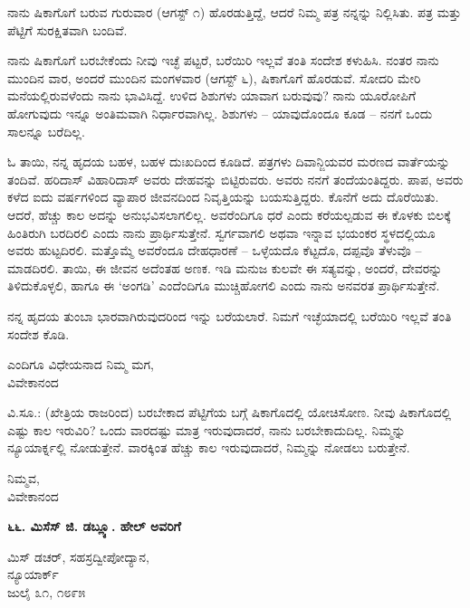 ನಾನು ಷಿಕಾಗೊಗೆ ಬರುವ ಗುರುವಾರ (ಆಗಸ್ಟ್ ೧) ಹೊರಡುತ್ತಿದ್ದೆ, ಆದರೆ ನಿಮ್ಮ ಪತ್ರ ನನ್ನನ್ನು ನಿಲ್ಲಿಸಿತು. ಪತ್ರ ಮತ್ತು ಪೆಟ್ಟಿಗೆ ಸುರಕ್ಷಿತವಾಗಿ ಬಂದಿವೆ.

ನಾನು ಷಿಕಾಗೊಗೆ ಬರಬೇಕೆಂದು ನೀವು ಇಚ್ಛೆ ಪಟ್ಟರೆ, ಬರೆಯಿರಿ ಇಲ್ಲವೆ ತಂತಿ ಸಂದೇಶ ಕಳುಹಿಸಿ. ನಂತರ ನಾನು ಮುಂದಿನ ವಾರ, ಅಂದರೆ ಮುಂದಿನ ಮಂಗಳವಾರ (ಆಗಸ್ಟ್ ೬), ಷಿಕಾಗೊಗೆ ಹೊರಡುವೆ. ಸೋದರಿ ಮೇರಿ ಮನೆಯಲ್ಲಿರುವಳೆಂದು ನಾನು ಭಾವಿಸಿದ್ದೆ. ಉಳಿದ ಶಿಶುಗಳು ಯಾವಾಗ ಬರುವುವು? ನಾನು ಯೂರೋಪಿಗೆ ಹೋಗುವುದು ಇನ್ನೂ ಅಂತಿಮವಾಗಿ ನಿರ್ಧಾರವಾಗಿಲ್ಲ. ಶಿಶುಗಳು – ಯಾವುದೊಂದೂ ಕೂಡ – ನನಗೆ ಒಂದು ಸಾಲನ್ನೂ ಬರೆದಿಲ್ಲ.

ಓ ತಾಯಿ, ನನ್ನ ಹೃದಯ ಬಹಳ, ಬಹಳ ದುಃಖದಿಂದ ಕೂಡಿದೆ. ಪತ್ರಗಳು ದಿವಾನ್ಜಿಯವರ ಮರಣದ ವಾರ್ತೆಯನ್ನು ತಂದಿವೆ. ಹರಿದಾಸ್ ವಿಹಾರಿದಾಸ್ ಅವರು ದೇಹವನ್ನು ಬಿಟ್ಟಿರುವರು. ಅವರು ನನಗೆ ತಂದೆಯಂತಿದ್ದರು. ಪಾಪ, ಅವರು ಕಳೆದ ಐದು ವರ್ಷಗಳಿಂದ ವ್ಯಾಪಾರ ಜೀವನದಿಂದ ನಿವೃತ್ತಿಯನ್ನು ಬಯಸುತ್ತಿದ್ದರು. ಕೊನೆಗೆ ಅದು ದೊರೆಯಿತು. ಆದರೆ, ಹೆಚ್ಚು ಕಾಲ ಅದನ್ನು ಅನುಭವಿಸಲಾಗಲಿಲ್ಲ. ಅವರೆಂದಿಗೂ ಧರೆ ಎಂದು ಕರೆಯಲ್ಪಡುವ ಈ ಕೊಳಕು ಬಿಲಕ್ಕೆ ಹಿಂತಿರುಗಿ ಬರದಿರಲಿ ಎಂದು ನಾನು ಪ್ರಾರ್ಥಿಸುತ್ತೇನೆ. ಸ್ವರ್ಗವಾಗಲಿ ಅಥವಾ ಇನ್ನಾವ ಭಯಂಕರ ಸ್ಥಳದಲ್ಲಿಯೂ ಅವರು ಹುಟ್ಟದಿರಲಿ. ಮತ್ತೊಮ್ಮೆ ಅವರೆಂದೂ ದೇಹಧಾರಣೆ – ಒಳ್ಳೆಯದೊ ಕೆಟ್ಟದೊ, ದಪ್ಪವೊ ತೆಳುವೊ – ಮಾಡದಿರಲಿ. ತಾಯಿ, ಈ ಜೀವನ ಅದೆಂತಹ ಅಣಕ. ಇಡಿ ಮನುಜ ಕುಲವೇ ಈ ಸತ್ಯವನ್ನು, ಅಂದರೆ, ದೇವರನ್ನು ತಿಳಿದುಕೊಳ್ಳಲಿ, ಹಾಗೂ ಈ ‘ಅಂಗಡಿ’ ಎಂದೆಂದಿಗೂ ಮುಚ್ಚಿಹೋಗಲಿ ಎಂದು ನಾನು ಅನವರತ ಪ್ರಾರ್ಥಿಸುತ್ತೇನೆ.

ನನ್ನ ಹೃದಯ ತುಂಬಾ ಭಾರವಾಗಿರುವುದರಿಂದ ಇನ್ನು ಬರೆಯಲಾರೆ. ನಿಮಗೆ ಇಚ್ಛೆಯಾದಲ್ಲಿ ಬರೆಯಿರಿ ಇಲ್ಲವೆ ತಂತಿ ಸಂದೇಶ ಕೊಡಿ.

\begin{flushright}
ಎಂದಿಗೂ ವಿಧೇಯನಾದ ನಿಮ್ಮ ಮಗ,\\ವಿವೇಕಾನಂದ
\end{flushright}

ವಿ.ಸೂ.: (ಖೇತ್ರಿಯ ರಾಜರಿಂದ) ಬರಬೇಕಾದ ಪೆಟ್ಟಿಗೆಯ ಬಗ್ಗೆ ಷಿಕಾಗೊದಲ್ಲಿ ಯೋಚಿಸೋಣ. ನೀವು ಷಿಕಾಗೊದಲ್ಲಿ ಎಷ್ಟು ಕಾಲ ಇರುವಿರಿ? ಒಂದು ವಾರದಷ್ಟು ಮಾತ್ರ ಇರುವುದಾದರೆ, ನಾನು ಬರಬೇಕಾದುದಿಲ್ಲ. ನಿಮ್ಮನ್ನು ನ್ಯೂಯಾರ್ಕ್ನಲ್ಲಿ ನೋಡುತ್ತೇನೆ. ವಾರಕ್ಕಿಂತ ಹೆಚ್ಚು ಕಾಲ ಇರುವುದಾದರೆ, ನಿಮ್ಮನ್ನು ನೋಡಲು ಬರುತ್ತೇನೆ.

\begin{flushright}
ನಿಮ್ಮವ,\\ವಿವೇಕಾನಂದ
\end{flushright}

\begin{center}
\textbf{೬೬. ಮಿಸೆಸ್ ಜಿ. ಡಬ್ಲ್ಯೂ. ಹೇಲ್ ಅವರಿಗೆ}
\end{center}

\begin{flushright}
 ಮಿಸ್ ಡಚರ್, ಸಹಸ್ರದ್ವೀಪೋದ್ಯಾನ,\\ನ್ಯೂಯಾರ್ಕ್\\ಜುಲೈ ೩೧, ೧೮೯೫
\end{flushright}

